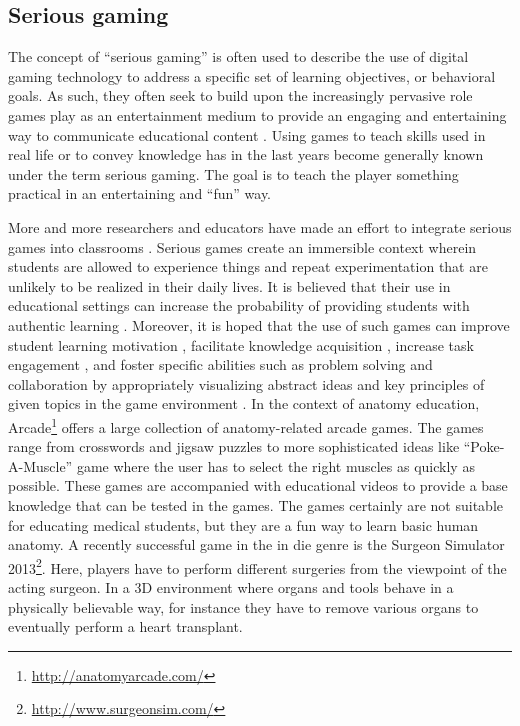 \subsection{Serious gaming}
The concept of ``serious gaming'' is often used to describe the use of digital gaming technology to address a specific set of learning objectives, or behavioral goals. As such, they often seek to build upon the increasingly pervasive role games play as an entertainment medium to provide an engaging and entertaining way to communicate educational content \cite{Schuller2013a}. 
Using games to teach skills used in real life or to convey knowledge has in the last years become generally known under the term serious gaming. The goal is to teach the player something practical in an entertaining and ``fun'' way.

More and more researchers and educators have made an effort to integrate serious games into classrooms \cite{Connolly2012}. Serious games create an immersible context wherein students are allowed to experience things and repeat experimentation that are unlikely to be realized in their daily lives. It is believed that their use in educational settings can increase the probability of providing students with authentic learning \cite{Cheng2012}. Moreover, it is hoped that the use of such games can improve student learning motivation \cite{Papastergiou2009}, facilitate knowledge acquisition \cite{Miller2011}, increase task engagement \cite{Annetta2009}, and foster specific abilities such as problem solving and collaboration \cite{Sanchez2011} by appropriately visualizing abstract ideas and key principles of given topics in the game environment \cite{Cheng2015}. 
In the context of anatomy education, Arcade\footnote{\url{http://anatomyarcade.com/}} offers a large collection of anatomy-related arcade games. The games range from crosswords and jigsaw puzzles to more sophisticated ideas like ``Poke-A-Muscle'' game where the user has to select the right muscles as quickly as possible. These games are accompanied with educational videos to provide a base knowledge that can be tested in the games. The games certainly are not suitable for educating medical students, but they are a fun way to learn basic human anatomy.
A recently successful game in the in die genre is the Surgeon Simulator 2013\footnote{\url{http://www.surgeonsim.com/}}. Here, players have to perform different surgeries from the viewpoint of the acting surgeon. In a 3D environment where organs and tools behave in a physically believable way, for instance they have to remove various organs to eventually perform a heart transplant. %
